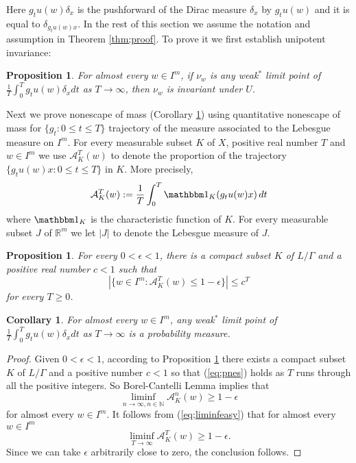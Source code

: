 \documentclass[12pt]{amsart}
\newtheorem{cor}[thm]{Corollary}
\newtheorem{prop}[thm]{Proposition}
\theoremstyle{definition}
\theoremstyle{remark}
\numberwithin{equation}{section}
\begin{document}
Here $g_t u(w)\delta_x$ is the pushforward of the Dirac measure $\delta_x$  by $g_tu(w)$ and 
it is equal to $\delta_{g_t u(w)x}$.
In the rest of this section we assume the notation and assumption in Theorem \ref {thm;proof}.
To prove it we first establish unipotent invariance:
\begin{prop}\label{prop;inv}
For almost every $w\in I^m$, if $\nu_w$ is any weak$^*$ limit point of
$\frac{1}{T}\int_0^T g_t u(w) \delta_xdt$ as $T\to \infty$, then $\nu_w$ is invariant under $U$.
\end{prop}

 

Next we prove  nonescape  of mass (Corollary \ref{cor;nescape})
using    quantitative nonescape of mass for $\{g_t: 0\le t\le T\}$ trajectory of the measure  associated to
the   Lebesgue measure on $I^m$. For every measurable subset $K$ of $X$, positive real number $T$ and 
$w\in I^m$ we use $\mathcal A_K^T(w)$ to denote the proportion of the trajectory $\{g_tu(w)x: 0\le t\le T\}$ in $K$. 
More precisely,
\begin{equation}\label{eq;average}
\mathcal A_K^T(w):=\frac{1}{T}\int_0^T \mathbbm 1 _K(g_tu(w)x)\,dt
\end{equation}
where $\mathbbm 1_K$ is the characteristic function of $K$. 
For every measurable subset $J$ of $\mathbb R^m$ we let $|J|$ to denote 
the Lebesgue measure of $J$.
\begin{prop}\label{prop;nescape}
For every $0<\epsilon <1 $, there is a compact subset 
 $K$ of $L/\Gamma$ and a positive real  number  $c<1$ such that 
 \begin{equation}\label{eq;pnes}
\left |\{w\in I^m: \mathcal A_K^T(w)\le 1- \epsilon   \}\right |\le  c^T
 \end{equation}
 for every $T\ge 0$.
\end{prop}

\begin{cor}\label{cor;nescape}
For almost every $w\in I^m$, any weak$^*$ limit point of 
$\frac{1}{T}\int_0^T g_tu(w)\delta_{x} dt$ as $T\to \infty $ is a probability measure.
\end{cor}
\begin{proof}
Given $0< \epsilon <1$,  according to Proposition \ref{prop;nescape} there exists   a compact subset $K$ of $L/\Gamma $
 and a positive number  $c<1$ so that  (\ref{eq;pnes}) holds
  as $T$ runs through all the positive integers.
So
 Borel-Cantelli Lemma implies  that 
 \begin{equation}\label{eq;liminfeasy}
 \liminf_{n\to \infty, n\in \mathbb N}\mathcal A_K^n(w)\ge 1- \epsilon
 \end{equation}
 for almost every  $w\in I^m$. It follows from (\ref{eq;liminfeasy})  that  for almost every $w\in I^m$
 \[
 \liminf_{T\to \infty} \mathcal A_{K}^T(w)\ge 1- \epsilon . 
 \]
 Since we can take  $ \epsilon $  arbitrarily  close to zero, the 
 conclusion follows.
 \end{proof}
\end{document}
